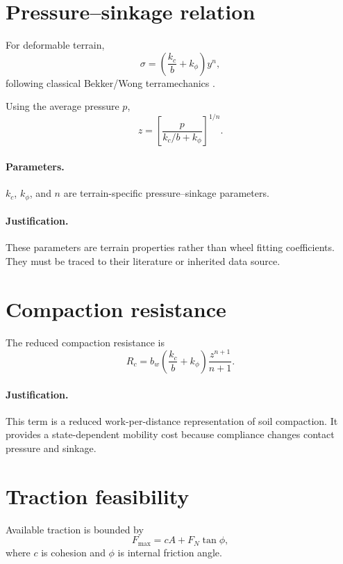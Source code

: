 \documentclass[11pt]{article}
\begin{document}
\section{Pressure--sinkage relation}

For deformable terrain,
\begin{equation}
\sigma=
\left(
\frac{k_c}{b}+k_\phi
\right)y^n,
\end{equation}
following classical Bekker/Wong terramechanics \cite{Bekker1969,Wong2010}.

Using the average pressure $p$,
\begin{equation}
z=
\left[
\frac{p}
{k_c/b+k_\phi}
\right]^{1/n}.
\end{equation}

\paragraph{Parameters.}
$k_c$, $k_\phi$, and $n$ are terrain-specific pressure--sinkage parameters.

\paragraph{Justification.}
These parameters are terrain properties rather than wheel fitting coefficients. They must be traced to their literature or inherited data source.

\section{Compaction resistance}

The reduced compaction resistance is
\begin{equation}
R_c=
b_w
\left(
\frac{k_c}{b}+k_\phi
\right)
\frac{z^{n+1}}{n+1}.
\end{equation}

\paragraph{Justification.}
This term is a reduced work-per-distance representation of soil compaction. It provides a state-dependent mobility cost because compliance changes contact pressure and sinkage.

\section{Traction feasibility}

Available traction is bounded by
\begin{equation}
F_{\max}=cA+F_N\tan\phi,
\end{equation}
where $c$ is cohesion and $\phi$ is internal friction angle.
\end{document}
